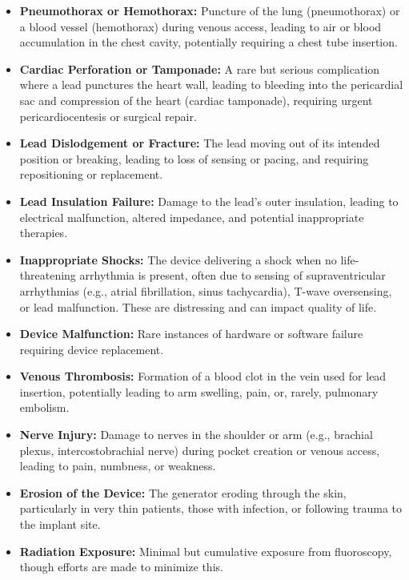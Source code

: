 \begin{itemize}
  \item \textbf{Pneumothorax or Hemothorax:} Puncture of the lung (pneumothorax) or a blood vessel (hemothorax) during venous access, leading to air or blood accumulation in the chest cavity, potentially requiring a chest tube insertion.
  
  \item \textbf{Cardiac Perforation or Tamponade:} A rare but serious complication where a lead punctures the heart wall, leading to bleeding into the pericardial sac and compression of the heart (cardiac tamponade), requiring urgent pericardiocentesis or surgical repair.
  
  \item \textbf{Lead Dislodgement or Fracture:} The lead moving out of its intended position or breaking, leading to loss of sensing or pacing, and requiring repositioning or replacement.
  
  \item \textbf{Lead Insulation Failure:} Damage to the lead's outer insulation, leading to electrical malfunction, altered impedance, and potential inappropriate therapies.
  
  \item \textbf{Inappropriate Shocks:} The device delivering a shock when no life-threatening arrhythmia is present, often due to sensing of supraventricular arrhythmias (e.g., atrial fibrillation, sinus tachycardia), T-wave oversensing, or lead malfunction. These are distressing and can impact quality of life.
  
  \item \textbf{Device Malfunction:} Rare instances of hardware or software failure requiring device replacement.
  
  \item \textbf{Venous Thrombosis:} Formation of a blood clot in the vein used for lead insertion, potentially leading to arm swelling, pain, or, rarely, pulmonary embolism.
  
  \item \textbf{Nerve Injury:} Damage to nerves in the shoulder or arm (e.g., brachial plexus, intercostobrachial nerve) during pocket creation or venous access, leading to pain, numbness, or weakness.
  
  \item \textbf{Erosion of the Device:} The generator eroding through the skin, particularly in very thin patients, those with infection, or following trauma to the implant site.
  
  \item \textbf{Radiation Exposure:} Minimal but cumulative exposure from fluoroscopy, though efforts are made to minimize this.
\end{itemize}


